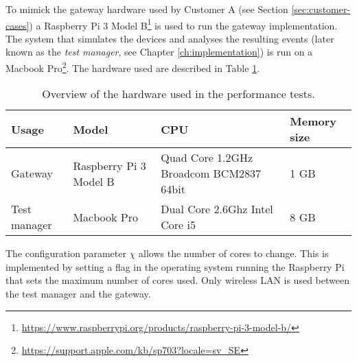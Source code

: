 To mimick the gateway hardware used by Customer A (see Section
\ref{sec:customer-cases}) a Raspberry Pi 3 Model
B\footnote{\url{https://www.raspberrypi.org/products/raspberry-pi-3-model-b/}}
is used to run the gateway implementation. The system that simulates the
devices and analyses the resulting events (later known as the \textit{test
manager}, see Chapter \ref{ch:implementation}) is run on a Macbook
Pro\footnote{\url{https://support.apple.com/kb/sp703?locale=sv_SE}}. The
hardware used are described in Table \ref{tab:test_environment_hardware}.

\begin{table}[h!]
    \caption{Overview of the hardware used in the performance tests.}
    \label{tab:test_environment_hardware}

    \begin{center}
        \begin{tabular}{|l|l|p{4cm}|l|}
            \hline
            Usage           & Model                     & CPU  & Memory size \\
            \hline
            Gateway         & Raspberry Pi 3 Model B    & Quad Core 1.2GHz Broadcom
            BCM2837 64bit  & 1 GB \\

            Test manager    & Macbook Pro               & Dual Core 2.6Ghz
            Intel Core i5    & 8 GB \\
            \hline
        \end{tabular}
    \end{center}
\end{table}

The configuration parameter $\chi$ allows the number of cores to change. This
is implemented by setting a flag in the operating system running the Raspberry
Pi that sets the maximum number of cores used. Only wireless LAN is used
between the test manager and the gateway.
